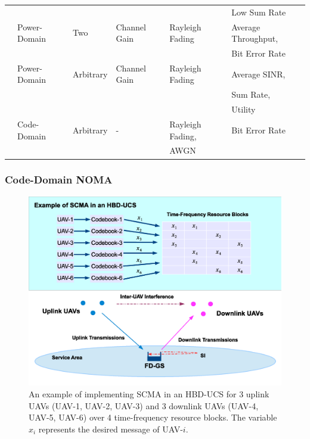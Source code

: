\begin{table}[]
{\begin{tabular}{llllll}
															&								&										&											&													& Low Sum Rate 					\\ 
\cite{liang2017user} 					& Power-Domain 	& Two 							& Channel Gain 				& Rayleigh Fading 				& Average Throughput,		\\
															&								&										&											&													&	Bit Error Rate 				\\
\cite{xiao2017reinforcement} 	& Power-Domain 	& Arbitrary 				& Channel Gain 				& Rayleigh Fading 				& Average SINR, 				\\
															&								&										&											&													&	Sum Rate, 						\\ 
															&								&										&											&													& Utility 							\\
\cite{kim2018deep} 						& Code-Domain 	& Arbitrary 				& -  									& Rayleigh Fading, 			 	& Bit Error Rate 				\\ 
															&								&										&											& AWGN										& 											\\ \hline
\end{tabular}}
\end{table}

\subsubsection{Code-Domain NOMA}

\begin{figure} [t]
\centering
\includegraphics [width=0.6\columnwidth]{chap2_fig/SCMA_HBD_UCS_example.eps} 
\caption{An example of implementing SCMA in an HBD-UCS for 3 uplink UAVs (UAV-1, UAV-2, UAV-3) and 3 downlink UAVs (UAV-4, UAV-5, UAV-6) over 4 time-frequency resource blocks. The variable $x_i$ represents the desired message of UAV-$i$.}
\label{fig:lit_review_SCMA_HBD_UCS_example}
\end{figure}

